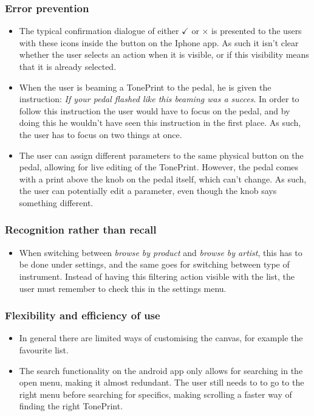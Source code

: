 \subsubsection{Error prevention}
\begin{itemize}
	\item The typical confirmation dialogue of either \textcolor{xGreen}{\textbf{$\checkmark$}} or \textcolor{xRed}{\textbf{$\times$}} is presented to the users with these icons inside the button on the Iphone app. As such it isn’t clear whether the user selects an action when it is visible, or if this visibility means that it is already selected.\\
	\item When the user is beaming a TonePrint to the pedal, he is given the instruction: \textit{If your pedal flashed like this beaming was a succes}. In order to follow this instruction the user would have to focus on the pedal, and by doing this he wouldn't have seen this instruction in the first place. As such, the user has to focus on two things at once.\\
	\item The user can assign different parameters to the same physical button on the pedal, allowing for live editing of the TonePrint. However, the pedal comes with a print above the knob on the pedal itself, which can't change. As such, the user can potentially edit a parameter, even though the knob says something different.
\end{itemize}
%
\subsubsection{Recognition rather than recall}
\begin{itemize}
	\item When switching between \textit{browse by product} and \textit{browse by artist}, this has to be done under settings, and the same goes for switching between type of instrument. Instead of having this filtering action visible with the list, the user must remember to check this in the settings menu. 
\end{itemize}
%
\subsubsection{Flexibility and efficiency of use}
\begin{itemize}
	\item In general there are limited ways of customising the canvas, for example the favourite list.\\
	\item The search functionality on the android app only allows for searching in the open menu, making it almost redundant. The user still needs to to go to the right menu before searching for specifics, making scrolling a faster way of finding the right TonePrint.
\end{itemize}
%
